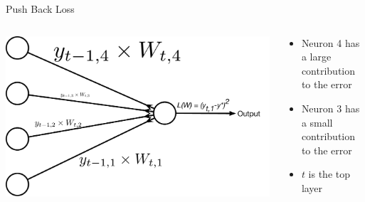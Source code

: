 \documentclass[aspectratio=169]{beamer}
\begin{document}
\begin{frame}{Push Back Loss}

\begin{columns}
\begin{column}{0.4\textwidth}
\includegraphics[width=1\textwidth]{lectBP/pushBackLoss.pdf}
\end{column}
\begin{column}{0.6\textwidth}
\begin{itemize}
\item Neuron 4 has a large contribution to the error
\item Neuron 3 has a small contribution to the error
\item $t$ is the top layer
\end{itemize}
\end{column}
\end{columns}

\end{frame}
\end{document}
